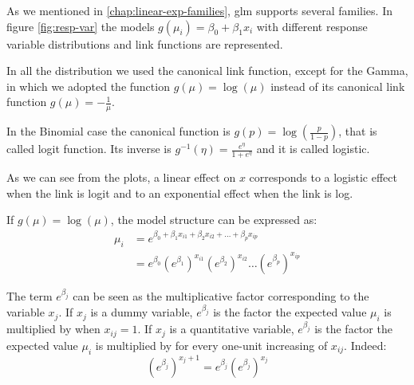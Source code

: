 \documentclass[a4paper, twoside, openright, 12pt]{report}
\let\origfigure\figure
\let\endorigfigure\endfigure
\renewenvironment{figure}[1][2] {
  \expandafter\origfigure\expandafter[!hbtp]
} {
  \endorigfigure
}
\theoremstyle{definition}
\theoremstyle{definition}
\theoremstyle{definition}
\theoremstyle{remark}
\begin{document}
As we mentioned in \ref{chap:linear-exp-families}, \ac{glm} supports several families. In figure \ref{fig:resp-var} the models \(g(\mu_i) = \beta_0 + \beta_1 x_i\) with different response variable distributions and link functions are represented.

In all the distribution we used the canonical link function, except for the Gamma, in which we adopted the function \(g(\mu)=\log(\mu)\) instead of its canonical link function \(g(\mu)=-\frac{1}{\mu}\).

In the Binomial case the canonical function is \(g(p) = \log{\left(\frac{p}{1-p}\right)}\), that is called logit function. Its inverse is \(g^{-1}(\eta) = \frac{e^{\eta}}{1 + e^{\eta}}\) and it is called logistic.

As we can see from the plots, a linear effect on \(x\) corresponds to a logistic effect when the link is logit and to an exponential effect when the link is log.





\begin{figure}[!hbtp]

{\centering {}\newline{}

}

\caption{Response variables and link functions.}\label{fig:resp-var}
\end{figure}

If \(g(\mu) = \log(\mu)\), the model structure can be expressed as:
\begin{align*}
\mu_i & = e^{\beta_0 + \beta_1 x_{i1} + \beta_2 x_{i2} + \dots + \beta_p x_{ip}} \\
& = e^{\beta_0} \left(e^{\beta_1}\right)^{x_{i1}} \left(e^{\beta_2}\right)^{x_{i2}} \dots \left(e^{\beta_p}\right)^{x_{ip}}
\end{align*}

The term \(e^{\beta_j}\) can be seen as the multiplicative factor corresponding to the variable \(x_j\). If \(x_j\) is a dummy variable, \(e^{\beta_j}\) is the factor the expected value \(\mu_i\) is multiplied by when \(x_{ij}=1\). If \(x_j\) is a quantitative variable, \(e^{\beta_j}\) is the factor the expected value \(\mu_i\) is multiplied by for every one-unit increasing of \(x_{ij}\). Indeed:
\[\left(e^{\beta_j}\right)^{x_j+1} = e^{\beta_j} \left(e^{\beta_j}\right)^{x_j}\]
\end{document}
